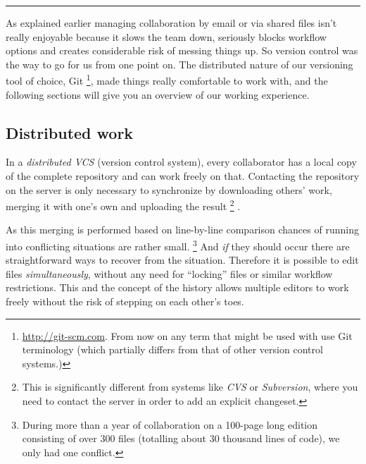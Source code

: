 \documentclass[11pt,a4paper]{article}
\begin{document}
\bigskip
\hrule

\bigskip
As explained earlier managing collaboration by email or via shared files isn't really
enjoyable because it slows the team down, seriously blocks workflow options and creates considerable risk
of messing things up. So version control was the way to go for us from one point on.
The distributed nature of our versioning tool of choice, Git%
\footnote{\url{http://git-scm.com}. From now on any term that might be used with use
Git terminology (which partially differs from that of other version control systems.)},
made things really comfortable to work with, and the following sections will give you
an overview of our working experience.

\subsection{Distributed work}
In a \textsl{distributed VCS} (version control system), every collaborator
has a local copy of the complete repository and can work freely on that.
Contacting the repository on the server is only necessary to synchronize by downloading
others' work, merging it with one's own and uploading the result%
\footnote{This is significantly different from systems like \emph{CVS} or \emph{Subversion},
where you need to contact the server in order to add an explicit changeset.}
.

As this merging is performed based on line-by-line comparison chances of running into
conflicting situations are rather small.%
\footnote{During more than a year of collaboration on a 100-page long edition
consisting of over 300 files (totalling about 30 thousand lines of code), we only had one conflict.}
And \emph{if} they should occur there are
straightforward ways to recover from the situation. Therefore it is possible to edit files
\emph{simultaneously}, without any need for “locking” files or similar workflow
restrictions. This and the concept of the history allows multiple editors to work freely
without the risk of stepping on each other's toes.
\end{document}
